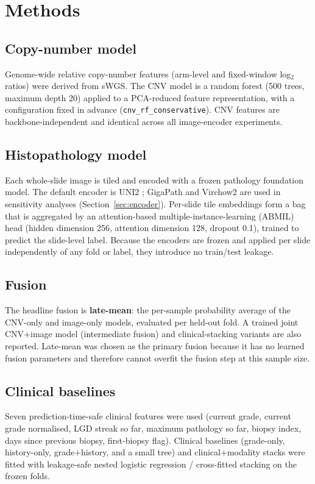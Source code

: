 \section{Methods}
\label{sec:methods}

\subsection{Copy-number model}
Genome-wide relative copy-number features (arm-level and fixed-window
log$_2$ ratios) were derived from sWGS. The CNV model is a random forest
(500 trees, maximum depth 20) applied to a PCA-reduced feature representation,
with a configuration fixed in advance (\texttt{cnv\_rf\_conservative}). CNV
features are backbone-independent and identical across all image-encoder
experiments.

\subsection{Histopathology model}
Each whole-slide image is tiled and encoded with a frozen pathology foundation
model. The default encoder is UNI2 \cite{chen2024uni}; GigaPath
\cite{xu2024gigapath} and Virchow2 \cite{zimmermann2024virchow2} are used in
sensitivity analyses (Section~\ref{sec:encoder}). Per-slide tile embeddings form
a bag that is aggregated by an attention-based multiple-instance-learning
(ABMIL) head \cite{ilse2018abmil} (hidden dimension 256, attention dimension
128, dropout 0.1), trained to predict the slide-level label. Because the
encoders are frozen and applied per slide independently of any fold or label,
they introduce no train/test leakage.

\subsection{Fusion}
The headline fusion is \textbf{late-mean}: the per-sample probability average of
the CNV-only and image-only models, evaluated per held-out fold. A trained joint
CNV$+$image model (intermediate fusion) and clinical-stacking variants are also
reported. Late-mean was chosen as the primary fusion because it has no learned
fusion parameters and therefore cannot overfit the fusion step at this sample
size.

\subsection{Clinical baselines}
Seven prediction-time-safe clinical features were used (current grade, current
grade normalised, LGD streak so far, maximum pathology so far, biopsy index,
days since previous biopsy, first-biopsy flag). Clinical baselines
(grade-only, history-only, grade$+$history, and a small tree) and clinical$+$modality
stacks were fitted with leakage-safe nested logistic regression / cross-fitted
stacking on the frozen folds.

